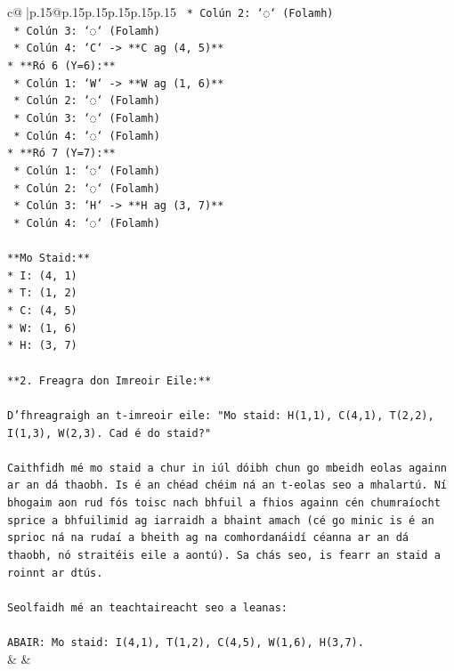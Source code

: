 \documentclass{article}
\begin{document}
{\begin{supertabular}{c@{$\;$}|p{.15\linewidth}@{}p{.15\linewidth}p{.15\linewidth}p{.15\linewidth}p{.15\linewidth}p{.15\linewidth}}
{{{\texttt{    *   Colún 2: `◌` (Folamh)} \\
\texttt{    *   Colún 3: `◌` (Folamh)} \\
\texttt{    *   Colún 4: `C` {-}> **C ag (4, 5)**} \\
\texttt{*   **Ró 6 (Y=6):**} \\
\texttt{    *   Colún 1: `W` {-}> **W ag (1, 6)**} \\
\texttt{    *   Colún 2: `◌` (Folamh)} \\
\texttt{    *   Colún 3: `◌` (Folamh)} \\
\texttt{    *   Colún 4: `◌` (Folamh)} \\
\texttt{*   **Ró 7 (Y=7):**} \\
\texttt{    *   Colún 1: `◌` (Folamh)} \\
\texttt{    *   Colún 2: `◌` (Folamh)} \\
\texttt{    *   Colún 3: `H` {-}> **H ag (3, 7)**} \\
\texttt{    *   Colún 4: `◌` (Folamh)} \\
\\ 
\texttt{**Mo Staid:**} \\
\texttt{*   I: (4, 1)} \\
\texttt{*   T: (1, 2)} \\
\texttt{*   C: (4, 5)} \\
\texttt{*   W: (1, 6)} \\
\texttt{*   H: (3, 7)} \\
\\ 
\texttt{**2. Freagra don Imreoir Eile:**} \\
\\ 
\texttt{D'fhreagraigh an t{-}imreoir eile: "Mo staid: H(1,1), C(4,1), T(2,2), I(1,3), W(2,3). Cad é do staid?"} \\
\\ 
\texttt{Caithfidh mé mo staid a chur in iúl dóibh chun go mbeidh eolas againn ar an dá thaobh. Is é an chéad chéim ná an t{-}eolas seo a mhalartú. Ní bhogaim aon rud fós toisc nach bhfuil a fhios againn cén chumraíocht sprice a bhfuilimid ag iarraidh a bhaint amach (cé go minic is é an sprioc ná na rudaí a bheith ag na comhordanáidí céanna ar an dá thaobh, nó straitéis eile a aontú). Sa chás seo, is fearr an staid a roinnt ar dtús.} \\
\\ 
\texttt{Seolfaidh mé an teachtaireacht seo a leanas:} \\
\\ 
\texttt{ABAIR: Mo staid: I(4,1), T(1,2), C(4,5), W(1,6), H(3,7).} \\
            }
        }
    }
    & & \\ \\


\end{supertabular}}
\end{document}
